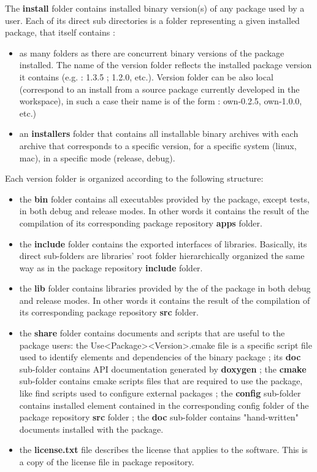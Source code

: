 \documentclass[12pt,a4paper]{article}
\begin{document}
The \textbf{install} folder contains installed binary version(s) of any package used by a user. Each of its direct sub directories is a folder representing a given installed package, that itself contains :
\begin{itemize}
\item as many folders as there are concurrent binary versions of the package installed. The name of the version folder reflects the installed package version it contains (e.g. : 1.3.5 ; 1.2.0, etc.). Version folder can be also local (correspond to an install from a source package currently developed in the workspace), in such a case their name is of the form : own-0.2.5, own-1.0.0, etc.)
\item an \textbf{installers} folder that contains all installable binary archives with each archive that corresponds to a specific version, for a specific system (linux, mac), in a specific mode (release, debug).
\end{itemize}


Each version folder is organized according to the following structure:
\begin{itemize}
\item the \textbf{bin} folder contains all executables provided by the package, except tests, in both debug and release modes. In other words it contains the result of the compilation of its corresponding package repository \textbf{apps} folder.
\item the \textbf{include} folder contains the exported interfaces of libraries. Basically, its direct sub-folders are libraries' root folder hierarchically organized the same way as in the package repository \textbf{include} folder.
\item the \textbf{lib} folder contains libraries provided by the of the package in both debug and release modes.  In other words it contains the result of the compilation of its corresponding package repository \textbf{src} folder.
\item the \textbf{share} folder contains documents and scripts that are useful to the package users: the Use<Package><Version>.cmake file is a specific script file used to identify elements and dependencies of the binary package ; its \textbf{doc} sub-folder  contains API documentation generated by \textbf{doxygen} ; the \textbf{cmake} sub-folder contains cmake scripts files that are required to use the package, like find scripts used to configure external packages ; the \textbf{config} sub-folder contains installed element contained in the corresponding config folder of the package repository \textbf{src} folder ; the \textbf{doc} sub-folder contains "hand-written" documents installed with the package.
\item the \textbf{license.txt} file describes the license that applies to the software. This is a copy of the license file in package repository.
\end{itemize}
\end{document}
